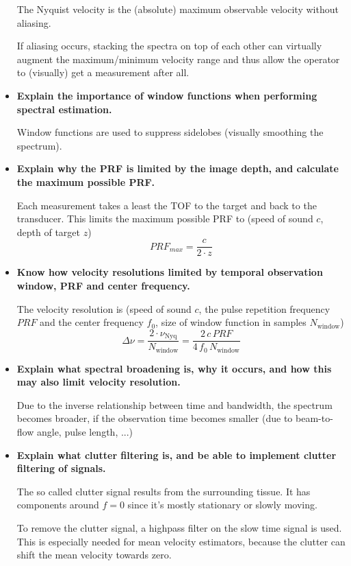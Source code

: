 \documentclass[10pt,a4paper,noendnumber=true]{scrartcl}
\begin{document}
\begin{itemize}
The Nyquist velocity is the (absolute) maximum observable velocity without aliasing.

If aliasing occurs, stacking the spectra on top of each other can virtually augment the maximum/minimum velocity range and thus allow the operator to (visually) get a measurement after all.


\item \textbf{Explain the importance of window functions when performing spectral estimation.}

Window functions are used to suppress sidelobes (visually smoothing the spectrum).

\item \textbf{Explain why the PRF is limited by the image depth, and calculate the maximum possible PRF.}

Each measurement takes a least the TOF to the target and back to the transducer. This limits the maximum possible PRF to (speed of sound $c$, depth of target $z$)
\begin{equation}
PRF_{max} = \frac{c}{2\cdot z}
\end{equation}

\item \textbf{Know how velocity resolutions limited by temporal observation window, PRF and center frequency.}

The velocity resolution is (speed of sound $c$, the pulse repetition frequency $PRF$ and the center frequency $f_0$, size of window function in samples $N_\text{window}$)
\begin{equation}
\Delta\nu = \frac{2\cdot\nu_\text{Nyq}}{N_\text{window}} = \frac{2\,c\,PRF}{4\,f_0\,N_\text{window}}
\end{equation}

\item \textbf{Explain what spectral broadening is, why it occurs, and how this may also limit velocity resolution.}

Due to the inverse relationship between time and bandwidth, the spectrum becomes broader, if the observation time becomes smaller (due to beam-to-flow angle, pulse length, ...)

\item \textbf{Explain what clutter filtering is, and be able to implement clutter filtering of signals.}

The so called clutter signal results from the surrounding tissue. It has components around $f=0$ since it's mostly stationary or slowly moving.

To remove the clutter signal, a highpass filter on the slow time signal is used. This is especially needed for mean velocity estimators, because the clutter can shift the mean velocity towards zero.

\end{itemize}
\end{document}

